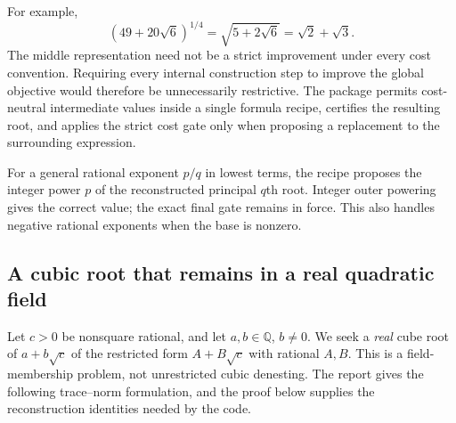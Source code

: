 \documentclass[11pt,letterpaper]{article}
\newcommand{\Q}{\mathbb{Q}}
\theoremstyle{definition}
\theoremstyle{remark}
\begin{document}
For example,
\begin{equation}
 (49+20\sqrt6)^{1/4}
 =\sqrt{5+2\sqrt6}=\sqrt2+\sqrt3.
\end{equation}
The middle representation need not be a strict improvement under every cost convention. Requiring every internal construction step to improve the global objective would therefore be unnecessarily restrictive. The package permits cost-neutral intermediate values inside a single formula recipe, certifies the resulting root, and applies the strict cost gate only when proposing a replacement to the surrounding expression.

For a general rational exponent $p/q$ in lowest terms, the recipe proposes the integer power $p$ of the reconstructed principal $q$th root. Integer outer powering gives the correct value; the exact final gate remains in force. This also handles negative rational exponents when the base is nonzero.

\subsection{A cubic root that remains in a real quadratic field}\label{sec:cubic}

Let $c>0$ be nonsquare rational, and let $a,b\in\Q$, $b\ne0$. We seek a \emph{real} cube root of $a+b\sqrt c$ of the restricted form $A+B\sqrt c$ with rational $A,B$. This is a field-membership problem, not unrestricted cubic denesting. The report gives the following trace--norm formulation, and the proof below supplies the reconstruction identities needed by the code.\cite{report}
\end{document}
